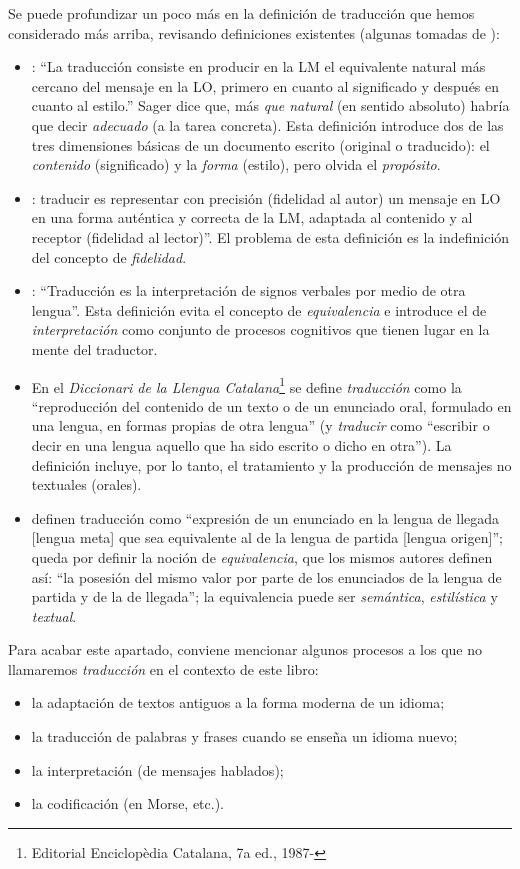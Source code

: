 Se puede profundizar un poco más en la definición de traducción que hemos considerado más arriba, revisando definiciones existentes (algunas tomadas de \citealt{sager93b}): \begin{itemize} \item \citet[p.~19]{nida59b}: ``La traducción consiste en producir en la LM el equivalente natural más cercano del mensaje en la LO, primero en cuanto al significado y después en cuanto al estilo.'' Sager dice que, más \emph{que natural} (en sentido absoluto) habría que decir \emph{adecuado} (a la tarea concreta). Esta definición introduce dos de las tres dimensiones básicas de un documento escrito (original o traducido): el \emph{contenido} (significado) y la \emph{forma} (estilo), pero olvida el \emph{propósito}. \item \citet{flamand83b}: traducir es representar con precisión (fidelidad al autor) un mensaje en LO en una forma auténtica y correcta de la LM, adaptada al contenido y al receptor (fidelidad al lector)''. El problema de esta definición es la indefinición del concepto de \emph{fidelidad}. \item \citet{jakobson66b}: ``Traducción es la interpretación de signos verbales por medio de otra lengua''. Esta definición evita el concepto de \emph{equivalencia} e introduce el de \emph{interpretación} como conjunto de procesos cognitivos que tienen lugar en la mente del traductor. \item En el \emph{Diccionari de la Llengua Catalana}\footnote{Editorial Enciclopèdia Catalana, 7a ed., 1987-} se define {\em traducción} como la ``reproducción del contenido de un texto o de un enunciado oral, formulado en una lengua, en formas propias de otra lengua'' (y \emph{traducir} como ``escribir o decir en una lengua aquello que ha sido escrito o dicho en otra''). La definición incluye, por lo tanto, el tratamiento y la producción de mensajes no textuales (orales). \item \citet{alcaraz97b} definen traducción como ``expresión de un enunciado en la lengua de llegada [lengua meta] que sea equivalente al de la lengua de partida [lengua origen]''; queda por definir la noción de \emph{equivalencia}, que los mismos autores definen así: ``la posesión del mismo valor por parte de los enunciados de la lengua de partida y de la de llegada''; la equivalencia puede ser {\em semántica}, \emph{estilística} y \emph{textual}. \end{itemize} 

Para acabar este apartado, conviene mencionar algunos procesos a los que no llamaremos \emph{traducción} en el contexto de este libro: \begin{itemize} \item la adaptación de textos antiguos a la forma moderna de un idioma; \item la traducción de palabras y frases cuando se enseña un idioma nuevo; \item la interpretación (de mensajes hablados); \item la codificación (en Morse, etc.). \end{itemize} 

